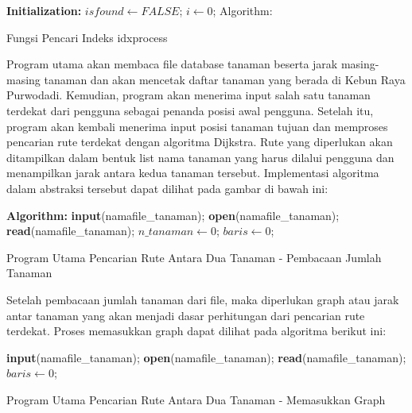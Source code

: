\documentclass[conference]{IEEEtran}
\begin{document}
\begin{algorithm}
\DontPrintSemicolon
{}
{\bf Initialization:}\;
$isfound \leftarrow FALSE$;\;
$i \leftarrow 0$;\;
Algorithm:\;
\caption{Fungsi Pencari Indeks idxprocess\label{IR}}
\end{algorithm}

Program utama akan membaca file database tanaman beserta jarak masing-masing tanaman dan akan mencetak daftar tanaman yang berada di Kebun Raya Purwodadi. Kemudian, program akan menerima input salah satu tanaman terdekat dari pengguna sebagai penanda posisi awal pengguna. Setelah itu, program akan kembali menerima input posisi tanaman tujuan dan memproses pencarian rute terdekat dengan algoritma Dijkstra. Rute yang diperlukan akan ditampilkan dalam bentuk list nama tanaman yang harus dilalui pengguna dan menampilkan jarak antara kedua tanaman tersebut. Implementasi algoritma dalam abstraksi tersebut dapat dilihat pada gambar di bawah ini:

\setlength{\intextsep}{0pt} 
\begin{algorithm}
\DontPrintSemicolon
{}
{\bf Algorithm:}\;
{\bf input}(namafile\_tanaman);\;
{\bf open}(namafile\_tanaman);\;
{\bf read}(namafile\_tanaman);\;
$n\_tanaman \leftarrow 0$;\;
$baris \leftarrow 0$;\;
\caption{Program Utama Pencarian Rute Antara Dua Tanaman - Pembacaan Jumlah Tanaman\label{IR}}
\end{algorithm}

\setlength{\intextsep}{0pt} 
Setelah pembacaan jumlah tanaman dari file, maka diperlukan graph atau jarak antar tanaman yang akan menjadi dasar perhitungan dari pencarian rute terdekat. Proses memasukkan graph dapat dilihat pada algoritma berikut ini:

\setlength{\intextsep}{5pt} 
\begin{algorithm}
\DontPrintSemicolon
{}
{\bf input}(namafile\_tanaman);\;
{\bf open}(namafile\_tanaman);\;
{\bf read}(namafile\_tanaman);\;
$baris \leftarrow 0$;\;
\caption{Program Utama Pencarian Rute Antara Dua Tanaman - Memasukkan Graph\label{IR}}
\end{algorithm}
\end{document}
